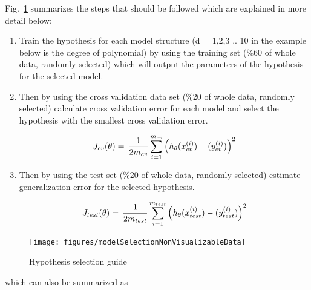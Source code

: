 Fig.~\ref{fig:modelSelection} summarizes the steps that should be followed which are explained in more detail below:

\begin{enumerate}
  \item Train the hypothesis for each model structure (d = 1,2,3 .. 10 in the example below is the degree of polynomial) by using the training set (\%60 of whole data, randomly selected) which will output the parameters of the hypothesis for the selected model.
  \item Then by using the cross validation data set (\%20 of whole data, randomly selected) calculate cross validation error for each model and select the hypothesis with the smallest cross validation error.

\begin{equation}{\label{eqn:costFuncCrossVal}}
J_{cv}(\theta)
=\,
\frac{1}{2m_{cv}} \sum\limits_{i=1}^{m_{cv}} \Big(h_\theta(x_{cv}^{(i)}) - (y_{cv}^{(i)})\Big)^2  
\end{equation} 

  \item Then by using the test set (\%20 of whole data, randomly selected) estimate generalization error for the selected hypothesis.
  
\begin{equation}{\label{eqn:costFuncTest}}
J_{test}(\theta)
=\,
\frac{1}{2m_{test}} \sum\limits_{i=1}^{m_{test}} \Big(h_\theta(x_{test}^{(i)}) - (y_{test}^{(i)})\Big)^2  
\end{equation} 

\end{enumerate}

\begin{landscape}
\begin{figure}
\begin{center}
\texttt{[image: figures/modelSelectionNonVisualizableData]}    %
\caption{Hypothesis selection guide} 
\label{fig:modelSelection}
\end{center}
\end{figure}
\end{landscape}

which can also be summarized as


